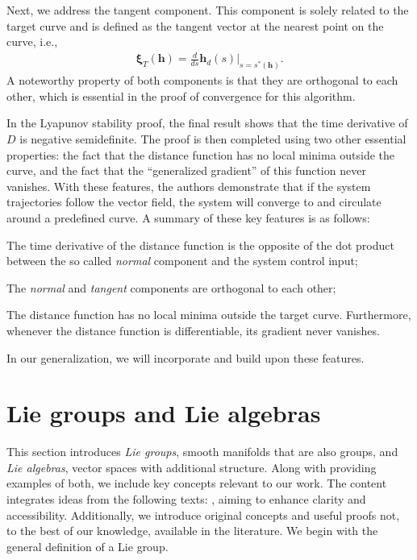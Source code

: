 Next, we address the tangent component. This component is solely related to the target curve and is defined as the tangent vector at the nearest point on the curve, i.e.,
\begin{align}
    \boldsymbol{\xi}_{T}(\mathbf{h}) = \frac{d}{ds}\mathbf{h}_d(s)|_{s=s^*(\mathbf{h})}.
\end{align}
A noteworthy property of both components is that they are orthogonal to each other, which is essential in the proof of convergence for this algorithm.

In the Lyapunov stability proof, the final result shows that the time derivative of $D$ is negative semidefinite. The proof is then completed using two other essential properties: the fact that the distance function has no local minima outside the curve, and the fact that the ``generalized gradient'' of this function never vanishes. With these features, the authors demonstrate that if the system trajectories follow the vector field, the system will converge to and circulate around a predefined curve. A summary of these key features is as follows:
\begin{feature}
    \item The time derivative of the distance function is the opposite of the dot product between the so called \emph{normal} component and the system control input; \label{feat:adriano-time-derivative-lyapunov-normal-comp}
    \item The \emph{normal} and \emph{tangent} components are orthogonal to each other; \label{feat:adriano-orthogonality}
    \item The distance function has no local minima outside the target curve. Furthermore, whenever the distance function is differentiable, its gradient never vanishes. \label{feat:adriano-no-local-minima}
\end{feature}
In our generalization, we will incorporate and build upon these features.

\section{Lie groups and Lie algebras}\label{sec:background-lie-theory}
This section introduces \emph{Lie groups}, smooth manifolds that are also groups, and \emph{Lie algebras}, vector spaces with additional structure. Along with providing examples of both, we include key concepts relevant to our work. The content integrates ideas from the following texts: \citet{Lee2012,Gallier2020,Hall2015,Duistermaat2012}, aiming to enhance clarity and accessibility. Additionally, we introduce original concepts and useful proofs not, to the best of our knowledge, available in the literature. We begin with the general definition of a Lie group.
